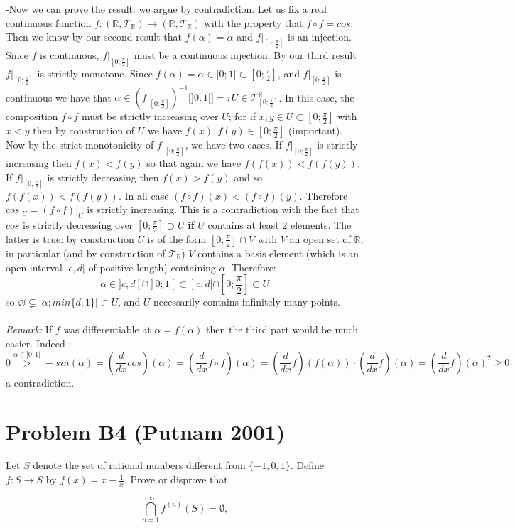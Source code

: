 \documentclass[11pt, a4paper, oneside]{article}
\newcommand{\problem}[1][]{\section{#1} \hfill \par}
\theoremstyle{remark}
\theoremstyle{lemma}
\begin{document}
-Now we can prove the result: we argue by contradiction. Let us fix a real continuous function $f:(\mathbb{R},\mathcal{T}_{\mathbb{R}})\longrightarrow(\mathbb{R},\mathcal{T}_{\mathbb{R}})$ with the property that $f\circ f=cos$. Then we know by our second result that $f(\alpha)=\alpha$ and $f|_{[0;\frac{\pi}{2}]}$ is an injection. Since $f$ is continuous, $f|_{[0;\frac{\pi}{2}]}$ must be a continuous injection. By our third result $f|_{[0;\frac{\pi}{2}]}$ is strictly monotone. Since $f(\alpha)=\alpha\in]0;1[\subset [0;\frac{\pi}{2}]$, and $f|_{[0;\frac{\pi}{2}]}$ is continuous we have that $\alpha\in (f|_{[0;\frac{\pi}{2}]})^{-1}\big[]0;1[\big]=:U\in\mathcal{T}_{[0;\frac{\pi}{2}]}^{\mathbb{R}}$. In this case, the composition $f\circ f$ must be strictly increasing over $U$; for if $x,y\in U\subset [0;\frac{\pi}{2}]$ with $x<y$ then by construction of $U$ we have $f(x),f(y)\in [0;\frac{\pi}{2}]$ (important). Now by the strict monotonicity of $f|_{[0;\frac{\pi}{2}]}$, we have two cases. If $f|_{[0;\frac{\pi}{2}]}$ is strictly increasing then $f(x)<f(y)$ so that again we have $f(f(x))<f(f(y))$. If $f|_{[0;\frac{\pi}{2}]}$ is strictly decreasing then $f(x)>f(y)$ and so $f(f(x))<f(f(y))$. In all case $(f\circ f)(x)<(f\circ f)(y)$. Therefore $cos|_U=(f\circ f)|_U$ is strictly increasing. This is a contradiction with the fact that $cos$ is strictly decreasing over $[0;\frac{\pi}{2}]\supset U$ \textbf{if} $U$ contains at least $2$ elements. The latter is true: by construction $U$ is of the form $[0;\frac{\pi}{2}]\cap V$ with $V$ an open set of $\mathbb{R}$, in particular (and by construction of $\mathcal{T}_{\mathbb{R}}$) $V$ contains a basis element (which is an open interval $]c,d[$ of positive length) containing $\alpha$. Therefore:
$$\alpha\in ]c,d[\cap]0;1[\subset]c,d[\cap[0;\frac{\pi}{2}]\subset U$$
so $\varnothing\subsetneq[\alpha;min\{d,1\}[\subset U$, and $U$ necessarily contains infinitely many points.
\\\\
\textit{Remark:} If $f$ was differentiable at $\alpha=f(\alpha)$ then the third part would be much easier. Indeed :
$$0\overset{\alpha\in]0;1[}{>}-sin(\alpha)=(\frac{d}{dx}cos)(\alpha)=(\frac{d}{dx}f\circ f)(\alpha)=(\frac{d}{dx}f)(f(\alpha))\cdot(\frac{d}{dx}f)(\alpha)=(\frac{d}{dx}f)(\alpha)^{2}\geq 0$$
a contradiction.
\newpage
\problem[Problem B4 (Putnam 2001)]
Let \( S \) denote the set of rational numbers different from \(\{-1, 0, 1\}\). Define \( f : S \to S \) by  
\( f(x) = x - \frac{1}{x} \). Prove or disprove that  

\[
\bigcap_{n=1}^{\infty} f^{(n)}(S) = \emptyset,
\]
\end{document}
